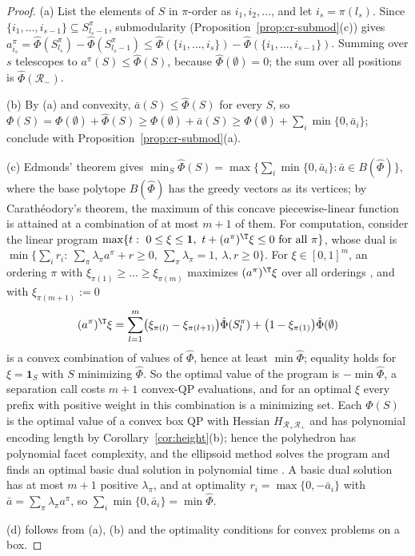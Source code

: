 \begin{proof}
(a) List the elements of $S$ in $\pi$-order as $i_1,i_2,\dots$, and let
$i_s=\pi(l_s)$. Since $\{i_1,\dots,i_{s-1}\}\subseteq S^\pi_{l_s-1}$,
submodularity (Proposition~\ref{prop:cr-submod}(c)) gives
$a^\pi_{i_s}=\hat\Phi(S^\pi_{l_s})-\hat\Phi(S^\pi_{l_s-1})
\le\hat\Phi(\{i_1,\dots,i_s\})-\hat\Phi(\{i_1,\dots,i_{s-1}\})$. Summing over
$s$ telescopes to $a^\pi(S)\le\hat\Phi(S)$, because $\hat\Phi(\emptyset)=0$;
the sum over all positions is $\hat\Phi(\mathcal R_-)$.

(b) By (a) and convexity, $\bar a(S)\le\hat\Phi(S)$ for every $S$, so
$\Phi(S)=\Phi(\emptyset)+\hat\Phi(S)\ge\Phi(\emptyset)+\bar a(S)
\ge\Phi(\emptyset)+\sum_i\min\{0,\bar a_i\}$; conclude with
Proposition~\ref{prop:cr-submod}(a).

(c) Edmonds' theorem gives
$\min_S\hat\Phi(S)=\max\{\sum_i\min\{0,\bar a_i\}:\bar a\in B(\hat\Phi)\}$,
where the base polytope $B(\hat\Phi)$ has the greedy vectors as its
vertices; by Carath\'eodory's theorem, the maximum of this concave
piecewise-linear function is attained at a combination of at most $m+1$ of
them. For
computation, consider the linear program
$\max\{t:\ 0\le\xi\le\mathbf 1,\ t+(a^\pi)^{\T}\xi\le0\ \text{for all }\pi\}$,
whose dual is $\min\{\sum_ir_i:\ \sum_\pi\lambda_\pi a^\pi+r\ge0,\
\sum_\pi\lambda_\pi=1,\ \lambda,r\ge0\}$. For $\xi\in[0,1]^m$, an ordering
$\pi$ with $\xi_{\pi(1)}\ge\dots\ge\xi_{\pi(m)}$ maximizes $(a^\pi)^{\T}\xi$
over all orderings \cite{Edmonds1970}, and with $\xi_{\pi(m+1)}:=0$
\[
(a^\pi)^{\T}\xi=\sum_{l=1}^m\bigl(\xi_{\pi(l)}-\xi_{\pi(l+1)}\bigr)
\hat\Phi(S^\pi_l)+\bigl(1-\xi_{\pi(1)}\bigr)\hat\Phi(\emptyset)
\]
is a convex combination of values of $\hat\Phi$, hence at least
$\min\hat\Phi$; equality holds for $\xi=\mathbf 1_S$ with $S$ minimizing
$\hat\Phi$. So the optimal value of the program is $-\min\hat\Phi$, a
separation call costs $m+1$ convex-QP evaluations, and for an optimal $\xi$
every prefix with positive weight in this combination is a minimizing set.
Each $\Phi(S)$ is the optimal value of a convex box QP with Hessian
$H_{\mathcal R_+\mathcal R_+}$ and has polynomial encoding length by
Corollary~\ref{cor:height}(b); hence the polyhedron has polynomial facet
complexity, and the ellipsoid method solves the program and finds an optimal
basic dual solution in polynomial time
\cite[Theorem~6.4.9, Lemma~6.5.15]{GrotschelLovaszSchrijver1988}. A basic
dual solution has at most $m+1$ positive $\lambda_\pi$, and at optimality
$r_i=\max\{0,-\bar a_i\}$ with $\bar a=\sum_\pi\lambda_\pi a^\pi$, so
$\sum_i\min\{0,\bar a_i\}=\min\hat\Phi$.

(d) follows from (a), (b) and the optimality conditions for convex problems
on a box.
\end{proof}

